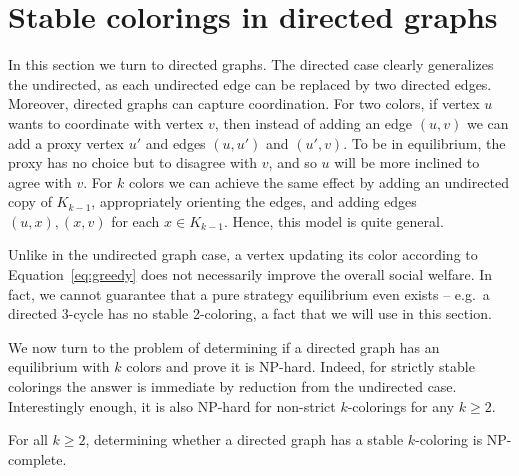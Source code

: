 \documentclass{llncs}
\begin{document}
\section{Stable colorings in directed graphs}

In this section we turn to directed graphs.  The directed case clearly
generalizes the undirected, as each undirected edge can be replaced by two
directed edges.  Moreover, directed graphs can capture coordination. For two
colors, if vertex $u$ wants to coordinate with vertex $v$, then instead of
adding an edge $(u,v)$ we can add a proxy vertex $u'$ and edges $(u,u')$ and
$(u',v)$. To be in equilibrium, the proxy has no choice but to disagree with
$v$, and so $u$ will be more inclined to agree with $v$. For $k$
colors we can achieve the same effect by adding an undirected copy of $K_{k-1}$, 
appropriately orienting the edges, and adding edges $(u,x), (x,v)$ for each $x
\in K_{k-1}$. Hence, this model is quite general.

Unlike in the undirected graph case, a vertex updating its color according to
Equation~\ref{eq:greedy} does not necessarily improve the overall social
welfare. In fact, we cannot guarantee that a pure strategy equilibrium even
exists -- e.g.\ a directed $3$-cycle has no stable 2-coloring, a fact that we
will use in this section.

We now turn to the problem of determining if a directed graph
has an equilibrium with $k$ colors and prove it is NP-hard.  Indeed, for
strictly stable colorings the answer is immediate by reduction from the
undirected case. Interestingly enough, it is also NP-hard for non-strict
$k$-colorings for any $k \geq 2$. 

\begin{theorem} 
For all $k \geq 2$, determining whether a directed graph has a
stable $k$-coloring is NP-complete.
\end{theorem}
\end{document}
